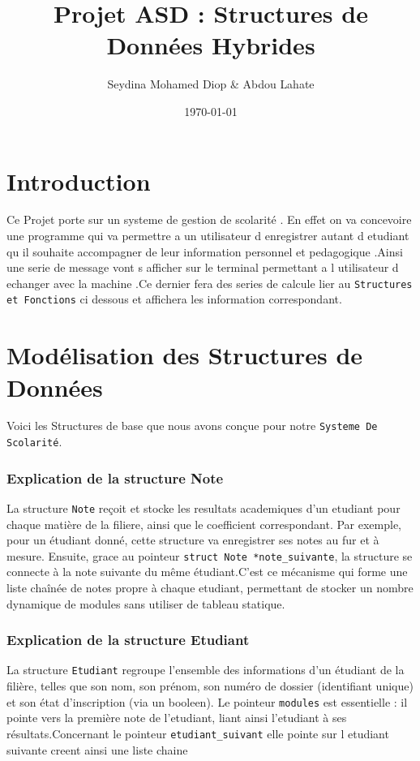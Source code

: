 \documentclass[12pt,a4paper]{article}
\begin{document}
\title{Projet ASD : Structures de Données Hybrides}
\author{Seydina Mohamed Diop \& Abdou Lahate}
\date{\today}
\maketitle

\section{Introduction}
Ce Projet porte sur un systeme de gestion de scolarité .
En effet on va concevoire une programme qui va permettre a un utilisateur d enregistrer autant d etudiant qu il souhaite accompagner de
leur information personnel et pedagogique .Ainsi une serie de message vont s afficher sur le terminal permettant a l utilisateur
d echanger avec la machine .Ce dernier fera des series de calcule lier au \texttt{Structures et Fonctions} ci dessous et affichera les 
information correspondant.

\section{Modélisation des Structures de Données}
Voici les Structures de base que nous avons conçue pour notre \texttt{Systeme De Scolarité}.



\subsubsection{Explication de la structure Note}
La structure \texttt{Note} reçoit et stocke les resultats academiques d'un etudiant
pour chaque matière de la filiere, ainsi que le coefficient correspondant. 
Par exemple, pour un étudiant donné, cette structure va enregistrer ses notes au fur et à mesure. 
Ensuite, grace au pointeur \texttt{struct Note *note\_suivante}, la structure se connecte à la note
suivante du même étudiant.C'est ce mécanisme qui forme une liste chaînée de notes propre à chaque etudiant, 
permettant de stocker un nombre dynamique de modules sans utiliser de tableau statique.



\subsubsection{Explication de la structure Etudiant}
La structure \texttt{Etudiant} regroupe l'ensemble des informations d'un étudiant de la filière, telles que son nom, son 
prénom, son numéro de dossier (identifiant unique) et son état d'inscription (via un booleen).
Le pointeur \texttt{modules}  est essentielle : il pointe vers la première note de l'etudiant, liant ainsi l'etudiant 
à ses résultats.Concernant le pointeur \texttt{etudiant\_suivant} elle pointe sur l etudiant suivante creent ainsi 
une liste chaine
\end{document}

